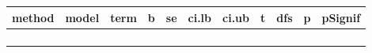 \documentclass[
]{book}
\begin{document}
\begin{tabular}{l|l|l|r|r|r|r|r|r|r|l}
\hline
method & model & term & b & se & ci.lb & ci.ub & t & dfs & p & pSignif\\
\hline
 & \cellcolor[HTML]{85C1E9}{\textcolor{gray}{NULL}} & \cellcolor[HTML]{85C1E9}{\textcolor{gray}{intrcpt}} & \cellcolor[HTML]{85C1E9}{\textcolor{gray}{-0.498}} & \cellcolor[HTML]{85C1E9}{\textcolor{gray}{0.203}} & \cellcolor[HTML]{85C1E9}{\textcolor{gray}{-0.928}} & \cellcolor[HTML]{85C1E9}{\textcolor{gray}{-0.067}} & \cellcolor[HTML]{85C1E9}{\textcolor{gray}{-2.454}} & \cellcolor[HTML]{85C1E9}{\textcolor{gray}{15.87}} & \cellcolor[HTML]{85C1E9}{\textcolor{gray}{0.026}} & \cellcolor[HTML]{85C1E9}{\textcolor{gray}{<.05}}\\
\cline{2-11}
\multirow[t]{-2}{*}{\raggedright\arraybackslash \cellcolor[HTML]{85C1E9}{\textcolor{gray}{PET (CHE)}}} & \cellcolor[HTML]{85C1E9}{\textcolor{gray}{FULL}} & \cellcolor[HTML]{85C1E9}{\textcolor{gray}{intrcpt}} & \cellcolor[HTML]{85C1E9}{\textcolor{gray}{-0.411}} & \cellcolor[HTML]{85C1E9}{\textcolor{gray}{0.195}} & \cellcolor[HTML]{85C1E9}{\textcolor{gray}{-0.818}} & \cellcolor[HTML]{85C1E9}{\textcolor{gray}{-0.005}} & \cellcolor[HTML]{85C1E9}{\textcolor{gray}{-2.108}} & \cellcolor[HTML]{85C1E9}{\textcolor{gray}{20.56}} & \cellcolor[HTML]{85C1E9}{\textcolor{gray}{0.048}} & \cellcolor[HTML]{85C1E9}{\textcolor{gray}{<.05}}\\
\cline{1-11}
\textcolor{black}{\em{\textbf{\cellcolor[HTML]{85C1E9}{PET (RVE hier)}}}} & \textcolor{black}{\em{\textbf{\cellcolor[HTML]{85C1E9}{NULL}}}} & \textcolor{black}{\em{\textbf{\cellcolor[HTML]{85C1E9}{intrcpt}}}} & \textcolor{black}{\em{\textbf{\cellcolor[HTML]{85C1E9}{-0.385}}}} & \textcolor{black}{\em{\textbf{\cellcolor[HTML]{85C1E9}{0.170}}}} & \textcolor{black}{\em{\textbf{\cellcolor[HTML]{85C1E9}{-0.797}}}} & \textcolor{black}{\em{\textbf{\cellcolor[HTML]{85C1E9}{0.027}}}} & \textcolor{black}{\em{\textbf{\cellcolor[HTML]{85C1E9}{-2.262}}}} & \textcolor{black}{\em{\textbf{\cellcolor[HTML]{85C1E9}{6.26}}}} & \textcolor{black}{\em{\textbf{\cellcolor[HTML]{85C1E9}{0.063}}}} & \textcolor{black}{\em{\textbf{\cellcolor[HTML]{85C1E9}{.}}}}\\
\cline{1-11}
\cellcolor[HTML]{85C1E9}{\textcolor{gray}{PET (RVE hier)}} & \cellcolor[HTML]{85C1E9}{\textcolor{gray}{FULL}} & \cellcolor[HTML]{85C1E9}{\textcolor{gray}{intrcpt}} & \cellcolor[HTML]{85C1E9}{\textcolor{gray}{-0.291}} & \cellcolor[HTML]{85C1E9}{\textcolor{gray}{0.163}} & \cellcolor[HTML]{85C1E9}{\textcolor{gray}{-0.627}} & \cellcolor[HTML]{85C1E9}{\textcolor{gray}{0.045}} & \cellcolor[HTML]{85C1E9}{\textcolor{gray}{-1.789}} & \cellcolor[HTML]{85C1E9}{\textcolor{gray}{24.09}} & \cellcolor[HTML]{85C1E9}{\textcolor{gray}{0.086}} & \cellcolor[HTML]{85C1E9}{\textcolor{gray}{.}}\\

\end{tabular}
\end{document}
